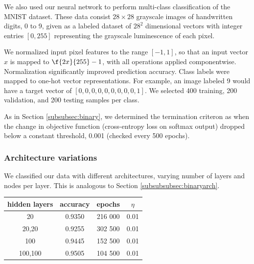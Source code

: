 \documentclass{article}
\begin{document}
\begin{multicols}{2}
We also used our neural network to perform multi-class classification of the
MNIST dataset. These data consist $28\times 28$ grayscale images of handwritten
digits, 0 to 9, given as a labeled dataset of $28^2$ dimensional vectors
with integer entries $[0,255]$ representing the grayscale luminescence of each pixel.

We normalized input pixel features to the range $[-1, 1]$,
so that an input vector $x$ is mapped to $\f{2x}{255}-1$,
with all operations applied componentwise.
Normalization significantly improved prediction accuracy.
Class labels were mapped to one-hot vector representations.
For example, an image labeled 9 would have a 
target vector of $[0,0,0,0,0,0,0,0,0,1]$.
We selected 400 training, 200 validation, and 200 testing samples per class.

As in Section \ref{subsubsec:binary}, we determined the termination criteron as
when the change in objective function (cross-entropy loss on softmax output)
dropped below a constant threshold, 0.001 (checked every 500 epochs).

\subsubsection{Architecture variations}

We classified our data with different architectures, varying number of layers
and nodes per layer. This is analogous to Section \ref{subsubsubsec:binaryarch}.



\begin{center}
\begin{tabular}{c|c|c|c}
hidden layers & accuracy	& epochs & $\eta$ \\\hline
        20		& 0.9350 	& 216 000 	& 0.01\\
        20,20	& 0.9255 	& 302 500 	& 0.01\\
        100		& 0.9445 	& 152 500 	& 0.01 \\
        100,100	& 0.9505 	& 104 500 	& 0.01
\end{tabular}
\end{center}



\end{multicols}
\end{document}

